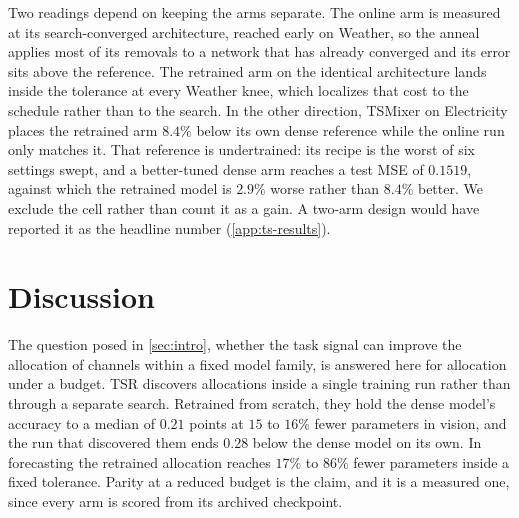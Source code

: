 \documentclass[10pt]{article}
\theoremstyle{paper}
\begin{document}
Two readings depend on keeping the arms separate. The online arm is measured at its search-converged architecture, reached early on Weather, so the anneal applies most of its removals to a network that has already converged and its error sits above the reference. The retrained arm on the identical architecture lands inside the tolerance at every Weather knee, which localizes that cost to the schedule rather than to the search. In the other direction, TSMixer on Electricity places the retrained arm $8.4\%$ below its own dense reference while the online run only matches it. That reference is undertrained: its recipe is the worst of six settings swept, and a better-tuned dense arm reaches a test MSE of $0.1519$, against which the retrained model is $2.9\%$ worse rather than $8.4\%$ better. We exclude the cell rather than count it as a gain. A two-arm design would have reported it as the headline number (\cref{app:ts-results}).

\section{Discussion}
\label{sec:discussion}
The question posed in \cref{sec:intro}, whether the task signal can improve the allocation of channels within a fixed model family, is answered here for allocation under a budget. TSR discovers allocations inside a single training run rather than through a separate search. Retrained from scratch, they hold the dense model's accuracy to a median of $0.21$ points at $15$ to $16\%$ fewer parameters in vision, and the run that discovered them ends $0.28$ below the dense model on its own. In forecasting the retrained allocation reaches $17\%$ to $86\%$ fewer parameters inside a fixed tolerance. Parity at a reduced budget is the claim, and it is a measured one, since every arm is scored from its archived checkpoint.
\end{document}
